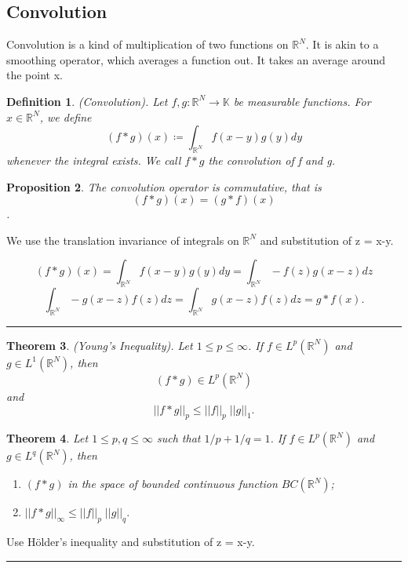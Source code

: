 \documentclass[twoside]{article}
\newcounter{lecnum}
\newtheorem{theorem}{Theorem}[lecnum]
\newtheorem{proposition}[theorem]{Proposition}
\newtheorem{definition}[theorem]{Definition}
\newenvironment{proof}{{\bf Proof:}}{\hfill\rule{2mm}{2mm}}
\begin{document}
\subsection{Convolution}
Convolution is a kind of multiplication of two functions on $\mathbb{R}^N$. It is akin to a smoothing operator, which averages a function out. It takes an average around the point x.

\begin{definition}(Convolution). Let $f,g: \mathbb{R}^N \rightarrow \mathbb{K}$ be measurable functions. For $x \in \mathbb{R}^N$, we define
$$
(f * g)(x) \coloneqq \int_{\mathbb{R}^N}f(x - y)g(y)dy
$$
whenever the integral exists. We call $f * g$ the convolution of f and g.
\end{definition}


\begin{proposition}
The convolution operator is commutative, that is $$(f * g)(x) = (g * f)(x)$$.
\end{proposition}
\begin{proof}
We use the translation invariance of integrals on $\mathbb{R}^N$ and substitution of z = x-y.

$$
(f * g)(x) = \int_{\mathbb{R}^N}f(x-y)g(y)dy = \int_{\mathbb{R}^N}-f(z)g(x-z)dz
$$
$$
\int_{\mathbb{R}^N}-g(x-z)f(z)dz = \int_{\mathbb{R}^N}g(x-z)f(z)dz = g*f(x).
$$
\end{proof}

\begin{theorem}(Young's Inequality). Let $1 \leq p \leq \infty$. If $f \in L^p(\mathbb{R}^N)$ and $g \in L^1(\mathbb{R}^N)$, then $$(f * g) \in L^p(\mathbb{R}^N)$$ and
$$
||f * g||_p \leq ||f||_p\;||g||_1.
$$
\end{theorem}

\begin{theorem}Let $1 \leq p,q \leq \infty$ such that $1/p + 1/q = 1$. If $f \in L^p(\mathbb{R}^N)$ and $g \in L^q(\mathbb{R}^N)$, then 

\begin{enumerate}
\item $(f * g)$ in the space of bounded continuous function $BC(\mathbb{R}^N)$;

\item $||f * g||_{\infty} \leq ||f||_p\;||g||_q.$
\end{enumerate}
\end{theorem}

\begin{proof} Use Hölder's inequality and substitution of z = x-y.
\end{proof}
\end{document}
